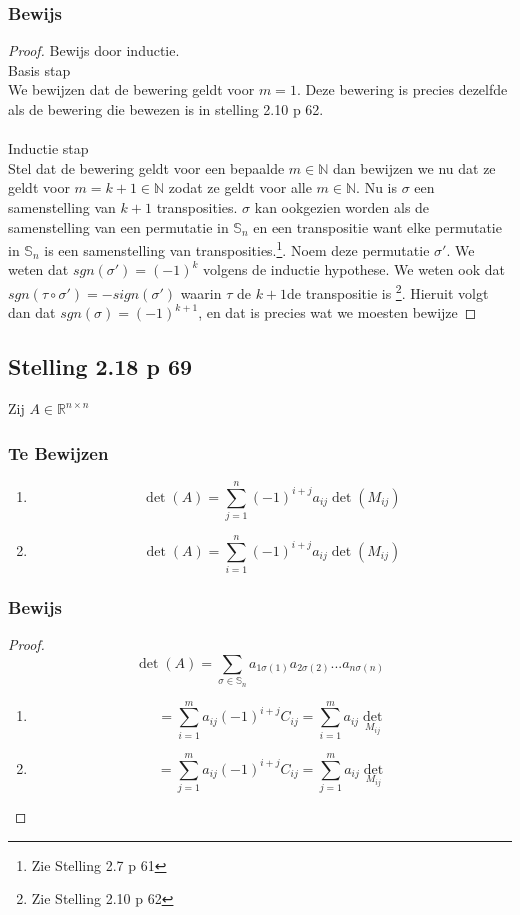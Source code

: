 \documentclass[lineaire_algebra_oplossingen.tex]{subfiles}
\begin{document}
\subsubsection*{Bewijs}
\begin{proof}
Bewijs door inductie.\\
\textsf{Basis stap}\\
We bewijzen dat de bewering geldt voor $m=1$. Deze bewering is precies dezelfde als de bewering die bewezen is in stelling 2.10 p 62.\\\\
\textsf{Inductie stap}\\
Stel dat de bewering geldt voor een bepaalde $m \in \mathbb{N}$ dan bewijzen we nu dat ze geldt voor $m=k+1 \in \mathbb{N}$ zodat ze geldt voor alle $m \in \mathbb{N}$.
Nu is $\sigma$ een samenstelling van $k+1$ transposities. $\sigma$ kan ookgezien worden als de samenstelling van een permutatie in $\mathbb{S}_n$ en een transpositie want elke permutatie in $\mathbb{S}_n$ is een samenstelling van transposities.\footnote{Zie Stelling 2.7 p 61}. Noem deze permutatie $\sigma'$. We weten dat $sgn(\sigma') = (-1)^k$ volgens de inductie hypothese. We weten ook dat $sgn(\tau \circ \sigma') = -sign(\sigma')$ waarin $\tau$ de $k+1$de transpositie is \footnote{Zie Stelling 2.10 p 62}. Hieruit volgt dan dat $sgn(\sigma) = (-1)^{k+1}$, en dat is precies wat we moesten bewijze
\end{proof}


\subsection{Stelling 2.18 p 69}
\label{2.18}
Zij $A \in \mathbb{R}^{n\times n}$

\subsubsection*{Te Bewijzen}
\begin{enumerate}
\item
\[
\det(A) = \sum_{j=1}^n(-1)^{i+j}a_{ij}\det(M_{ij})
\]
\item
\[
\det(A) = \sum_{i=1}^n(-1)^{i+j}a_{ij}\det(M_{ij})
\]
\end{enumerate}

\subsubsection*{Bewijs}
\begin{proof}
\[
\det(A) = \sum_{\sigma \in \mathbb{S}_n} a_{1\sigma(1)}a_{2\sigma(2)}...a_{n\sigma(n)}
\]
\begin{enumerate}
\item
\[
= \sum_{i=1}^m a_{ij} (-1)^{i+j}C_{ij}
= \sum_{i=1}^m a_{ij} \det_{M_{ij}}
\]
\item
\[
= \sum_{j=1}^m a_{ij} (-1)^{i+j}C_{ij}
= \sum_{j=1}^m a_{ij} \det_{M_{ij}}
\]
\end{enumerate}
\end{proof}
\end{document}
